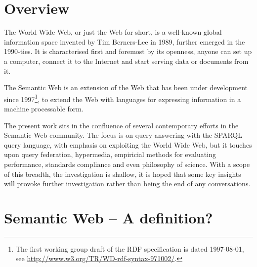 \section{Overview}\label{sec:introoverview}

The World Wide Web, or just the Web for short, is a well-known global
information space invented by Tim Berners-Lee in 1989, further emerged
in the 1990-ties. It is characterised first and foremost by its
openness, anyone can set up a computer, connect it to the Internet and
start serving data or documents from it. 

The Semantic Web is an extension of the Web that has been under
development since 1997\footnote{The first working group draft of the
  RDF specification is dated 1997-08-01, see
  \url{http://www.w3.org/TR/WD-rdf-syntax-971002/}.}, to extend the
Web with languages for expressing information in a machine processable
form\cite{semwebroadmap}.



The present work sits in the confluence of several contemporary
efforts in the Semantic Web community. The focus is on query answering
with the SPARQL query language, with emphasis on exploiting the World
Wide Web, but it touches upon query federation, hypermedia, empiricial
methods for evaluating performance, standards compliance and even
philosophy of science. With a scope of this breadth, the investigation
is shallow, it is hoped that some key insights will provoke further
investigation rather than being the end of any conversations.



\section{Semantic Web -- A definition?}\label{sec:nodef}


